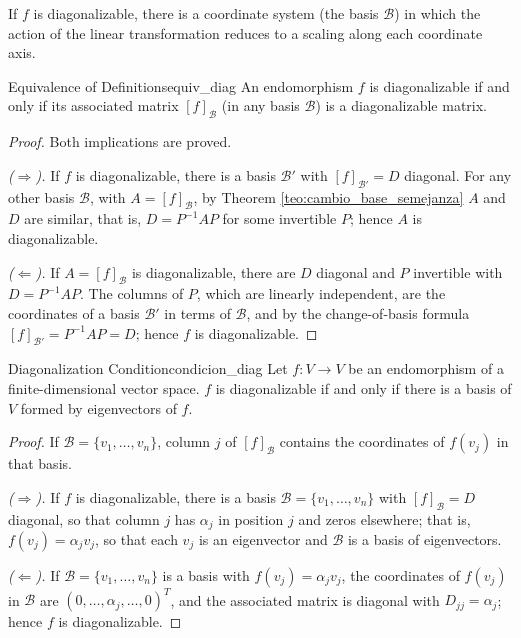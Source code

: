 \documentclass[11pt, a4paper]{article}
\begin{document}
\obs If $f$ is diagonalizable, there is a coordinate system (the basis $\mathcal{B}$) in which the action of the linear transformation reduces to a scaling along each coordinate axis.

\begin{proposicion}{Equivalence of Definitions}{equiv_diag}
An endomorphism $f$ is diagonalizable if and only if its associated matrix $[f]_\mathcal{B}$ (in any basis $\mathcal{B}$) is a diagonalizable matrix.
\end{proposicion}

\begin{proof}
Both implications are proved.

\textit{($\Rightarrow$).} If $f$ is diagonalizable, there is a basis $\mathcal{B}'$ with $[f]_{\mathcal{B}'} = D$ diagonal. For any other basis $\mathcal{B}$, with $A = [f]_\mathcal{B}$, by Theorem \ref{teo:cambio_base_semejanza} $A$ and $D$ are similar, that is, $D = P^{-1} A P$ for some invertible $P$; hence $A$ is diagonalizable.

\textit{($\Leftarrow$).} If $A = [f]_\mathcal{B}$ is diagonalizable, there are $D$ diagonal and $P$ invertible with $D = P^{-1} A P$. The columns of $P$, which are linearly independent, are the coordinates of a basis $\mathcal{B}'$ in terms of $\mathcal{B}$, and by the change-of-basis formula $[f]_{\mathcal{B}'} = P^{-1} A P = D$; hence $f$ is diagonalizable.
\end{proof}

\begin{teorema}{Diagonalization Condition}{condicion_diag}
Let $f: V \to V$ be an endomorphism of a finite-dimensional vector space.
$f$ is diagonalizable if and only if there is a basis of $V$ formed by eigenvectors of $f$.
\end{teorema}

\begin{proof}
If $\mathcal{B} = \{v_1, \dots, v_n\}$, column $j$ of $[f]_\mathcal{B}$ contains the coordinates of $f(v_j)$ in that basis.

\textit{($\Rightarrow$).} If $f$ is diagonalizable, there is a basis $\mathcal{B} = \{v_1, \dots, v_n\}$ with $[f]_\mathcal{B} = D$ diagonal, so that column $j$ has $\alpha_j$ in position $j$ and zeros elsewhere; that is, $f(v_j) = \alpha_j v_j$, so that each $v_j$ is an eigenvector and $\mathcal{B}$ is a basis of eigenvectors.

\textit{($\Leftarrow$).} If $\mathcal{B} = \{v_1, \dots, v_n\}$ is a basis with $f(v_j) = \alpha_j v_j$, the coordinates of $f(v_j)$ in $\mathcal{B}$ are $(0, \dots, \alpha_j, \dots, 0)^T$, and the associated matrix is diagonal with $D_{jj} = \alpha_j$; hence $f$ is diagonalizable.
\end{proof}
\end{document}
